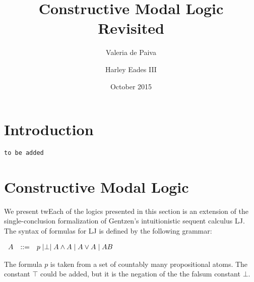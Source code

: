 \documentclass{article}
\title{Constructive Modal Logic Revisited}
\author{Valeria de Paiva \and Harley Eades III}
\date{October 2015}
\let\to\relax
\newcommand{\to}{\rightarrow}
\begin{document}
\maketitle

\section{Introduction}
{\tt to be added}

\section{Constructive Modal Logic}

We present twEach of the logics presented in this section is an extension of the
single-conclusion formalization of Gentzen's intuitionistic sequent
calculus LJ.  The syntax of formulas for LJ is defined by the
following grammar:
\begin{center}
    \begin{math}
        \begin{array}{lllllllll}
            A & ::= & p \mid \perp \mid A \land A \mid A \lor A \mid A \to B
        \end{array}
    \end{math}
\end{center}
The formula $p$ is taken from a set of countably many propositional atoms. The constant $\top$ could be added, but it is the negation of the the falsum constant $\bot$.
\end{document}
